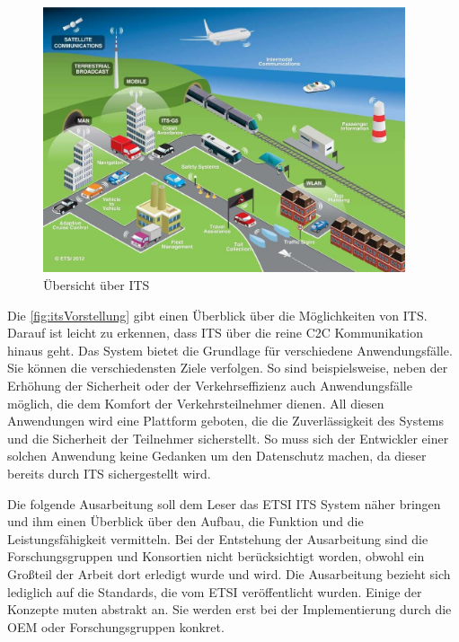 \begin{figure}[h]
	\includegraphics[width=0.95\textwidth]{content/images/00_einleitung/ETSI_ITS_09_2012.jpg}
	\caption{Übersicht über ITS \cite{ITS_vorstellung}}
	\label{fig:itsVorstellung}
\end{figure}

Die \autoref{fig:itsVorstellung} gibt einen Überblick über die Möglichkeiten von \ac{ITS}. Darauf ist leicht zu erkennen, dass \ac{ITS} über die reine \ac{C2C} Kommunikation hinaus geht. Das System bietet die Grundlage für verschiedene Anwendungsfälle. Sie können die verschiedensten Ziele verfolgen. So sind beispielsweise, neben der Erhöhung der Sicherheit oder der Verkehrseffizienz auch Anwendungsfälle möglich, die dem Komfort der Verkehrsteilnehmer dienen. All diesen Anwendungen wird eine Plattform geboten, die die Zuverlässigkeit des Systems und die Sicherheit der Teilnehmer sicherstellt. So muss sich der Entwickler einer solchen Anwendung keine Gedanken um den Datenschutz machen, da dieser bereits durch \ac{ITS} sichergestellt wird.

Die folgende Ausarbeitung soll dem Leser das \ac{ETSI} \ac{ITS} System näher bringen und ihm einen Überblick über den Aufbau, die Funktion und die Leistungsfähigkeit vermitteln. Bei der Entstehung der Ausarbeitung sind die Forschungsgruppen und Konsortien nicht berücksichtigt worden, obwohl ein Großteil der Arbeit dort erledigt wurde und wird. Die Ausarbeitung bezieht sich lediglich auf die Standards, die vom \ac{ETSI} veröffentlicht wurden. Einige der Konzepte muten abstrakt an. Sie werden erst bei der Implementierung durch die \ac{OEM} oder Forschungsgruppen konkret.

